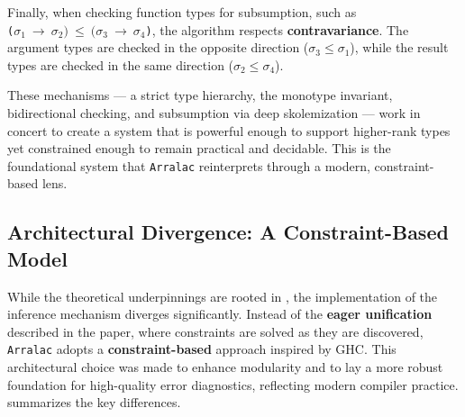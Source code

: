 Finally, when checking function types for subsumption, such as \\ \texttt{($\sigma_1~\rightarrow~\sigma_2)~\leq~(\sigma_3~\rightarrow~\sigma_4$)}, the algorithm respects \textbf{contravariance}. The argument types are checked in the opposite direction ($\sigma_3 \leq \sigma_1$), while the result types are checked in the same direction ($\sigma_2 \leq \sigma_4$).

These mechanisms --- a strict type hierarchy, the monotype invariant, bidirectional checking, and subsumption via deep skolemization --- work in concert to create a system that is powerful enough to support higher-rank types yet constrained enough to remain practical and decidable. This is the foundational system that \texttt{Arralac} reinterprets through a modern, constraint-based lens.

\subsection{Architectural Divergence: A Constraint-Based Model}
\label{sec:Design:ArralacApproach}

While the theoretical underpinnings are rooted in \cite{jones-practical-2007}, the implementation of the inference mechanism diverges significantly. Instead of the \textbf{eager unification} described in the paper, where constraints are solved as they are discovered, \texttt{Arralac} adopts a \textbf{constraint-based} approach inspired by GHC. This architectural choice was made to enhance modularity and to lay a more robust foundation for high-quality error diagnostics, reflecting modern compiler practice.  summarizes the key differences.

